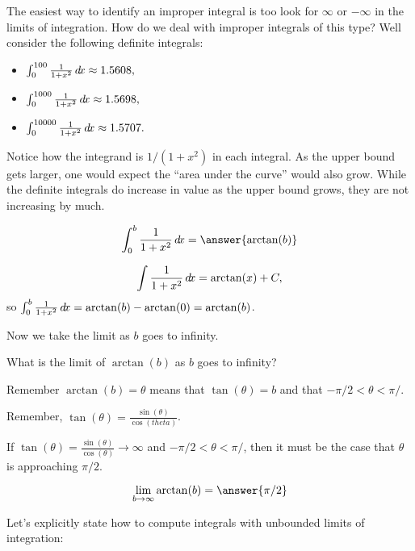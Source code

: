 \documentclass{ximera}
\begin{document}
The easiest way to identify an improper integral is too look for
$\infty$ or $-\infty$ in the limits of integration.  How do we deal
with improper integrals of this type? Well consider the following
definite integrals:
\begin{itemize}
\item	$\int_0^{100}\frac{1}{1+x^2} \mathop{}\!d\! x \approx 1.5608,$
\item	$\int_0^{1000}\frac{1}{1+x^2} \mathop{}\!d\! x \approx 1.5698,$
\item	$\int_0^{10000}\frac{1}{1+x^2} \mathop{}\!d\! x \approx 1.5707.$
\end{itemize}
Notice how the integrand is $1/(1+x^2)$ in each integral. As the upper
bound gets larger, one would expect the ``area under the curve'' would
also grow. While the definite integrals do increase in value as the
upper bound grows, they are not increasing by much.

\begin{question}
\[
\int_0^b \frac{1}{1+x^2} \d x =  \answer{\arctan(b)}
\]
\begin{hint}
  \[
  \int \frac{1}{1+x^2} \mathop{}\!d\! x = \arctan(x)+C,
  \]
  so $\int_0^b \frac{1}{1+x^2} \mathop{}\!d\! x = \arctan(b) -\arctan(0) = \arctan(b)$.
\end{hint}
\end{question}

Now we take the limit as $b$ goes to infinity.

\begin{question}
  What is the limit of $\arctan(b)$ as $b$ goes to infinity?
  \begin{hint}
    Remember $\arctan(b) = \theta$ means that $\tan(\theta) = b$ and
    that $-\pi/2 < \theta < \pi/$.
  \end{hint}
  \begin{hint}
    Remember, $\tan(\theta) = \frac{\sin(\theta)}{\cos(theta)}$.
  \end{hint}
  \begin{hint}
    If $\tan(\theta) = \frac{\sin(\theta)}{\cos(\theta)} \to \infty$
    and $-\pi/2 < \theta < \pi/$, then it must be the case that
    $\theta$ is approaching $\pi/2$.
  \end{hint}
  \begin{prompt}
    \[
    \lim_{b\to\infty} \arctan(b) = \answer{\pi/2}
    \]
  \end{prompt}
\end{question}

Let's explicitly state how to compute integrals with unbounded limits of integration:
\end{document}
